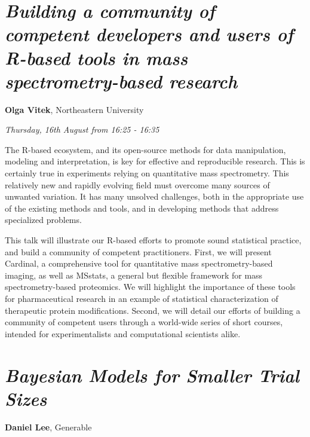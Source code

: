 \documentclass[]{book}
\theoremstyle{definition}
\theoremstyle{definition}
\theoremstyle{definition}
\theoremstyle{remark}
\begin{document}
\hypertarget{building-a-community-of-competent-developers-and-users-of-r-based-tools-in-mass-spectrometry-based-research-1}{%
\section{\texorpdfstring{\emph{Building a community of competent
developers and users of R-based tools in mass spectrometry-based
research}}{Building a community of competent developers and users of R-based tools in mass spectrometry-based research}}\label{building-a-community-of-competent-developers-and-users-of-r-based-tools-in-mass-spectrometry-based-research-1}}

\textbf{Olga Vitek}, Northeastern University

\emph{Thursday, 16th August from 16:25 - 16:35}

The R-based ecosystem, and its open-source methods for data
manipulation, modeling and interpretation, is key for effective and
reproducible research. This is certainly true in experiments relying on
quantitative mass spectrometry. This relatively new and rapidly evolving
field must overcome many sources of unwanted variation. It has many
unsolved challenges, both in the appropriate use of the existing methods
and tools, and in developing methods that address specialized problems.

This talk will illustrate our R-based efforts to promote sound
statistical practice, and build a community of competent practitioners.
First, we will present Cardinal, a comprehensive tool for quantitative
mass spectrometry-based imaging, as well as MSstats, a general but
flexible framework for mass spectrometry-based proteomics. We will
highlight the importance of these tools for pharmaceutical research in
an example of statistical characterization of therapeutic protein
modifications. Second, we will detail our efforts of building a
community of competent users through a world-wide series of short
courses, intended for experimentalists and computational scientists
alike.

\hypertarget{bayesian-models-for-smaller-trial-sizes-1}{%
\section{\texorpdfstring{\emph{Bayesian Models for Smaller Trial
Sizes}}{Bayesian Models for Smaller Trial Sizes}}\label{bayesian-models-for-smaller-trial-sizes-1}}

\textbf{Daniel Lee}, Generable
\end{document}

